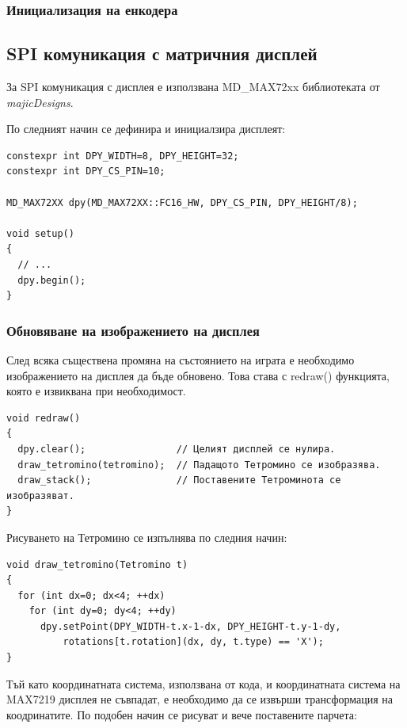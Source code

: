 \documentclass[titlepage, oneside, 14pt]{extbook}
\renewcommand{\texttt}[1]{{\small\ttfamily #1}}
\begin{document}
\subsubsection{Инициализация на енкодера}

\subsection{SPI комуникация с матричния дисплей}

За SPI комуникация с дисплея е използвана \texttt{MD_MAX72xx} библиотеката от \textit{majicDesigns}.

По следният начин се дефинира и инициалзира дисплеят:

\begin{verbatim}
constexpr int DPY_WIDTH=8, DPY_HEIGHT=32;
constexpr int DPY_CS_PIN=10;

MD_MAX72XX dpy(MD_MAX72XX::FC16_HW, DPY_CS_PIN, DPY_HEIGHT/8);

void setup()
{
  // ...
  dpy.begin();
}
\end{verbatim}

\subsubsection{Обновяване на изображението на дисплея}

След всяка съществена промяна на състоянието на играта е необходимо изображението на дисплея да бъде обновено.
Това става с \texttt{redraw()} функцията, която е извиквана при необходимост.

\begin{verbatim}
void redraw()
{
  dpy.clear();                // Целият дисплей се нулира.
  draw_tetromino(tetromino);  // Падащото Тетромино се изобразява.
  draw_stack();               // Поставените Тетроминота се изобразяват.
}
\end{verbatim}

Рисуването на Тетромино се изпълнява по следния начин:

\begin{verbatim}
void draw_tetromino(Tetromino t)
{
  for (int dx=0; dx<4; ++dx)
    for (int dy=0; dy<4; ++dy)
      dpy.setPoint(DPY_WIDTH-t.x-1-dx, DPY_HEIGHT-t.y-1-dy,
          rotations[t.rotation](dx, dy, t.type) == 'X');
}
\end{verbatim}

Тъй като координатната система, използвана от кода, и координатната система на MAX7219 дисплея не съвпадат,
е необходимо да се извърши трансформация на коодринатите. По подобен начин се рисуват и вече поставените парчета:
\end{document}
